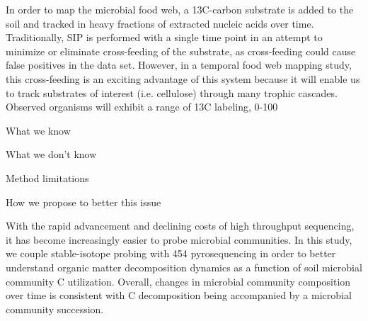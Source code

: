 In order to map the microbial food web, a 13C-carbon substrate is added to the soil and tracked in heavy fractions of extracted nucleic acids over time.  Traditionally, SIP is performed with a single time point in an attempt to minimize or eliminate cross-feeding of the substrate, as cross-feeding could cause false positives in the data set.  However, in a temporal food web mapping study, this cross-feeding is an exciting advantage of this system because it will enable us to track substrates of interest (i.e. cellulose) through many trophic cascades.  Observed organisms will exhibit a range of 13C labeling, 0-100%



What we know 


What we don't know


Method limitations


How we propose to better this issue

With the rapid advancement and declining costs of high throughput sequencing, it has become increasingly easier to probe microbial communities.  In this study, we couple stable-isotope probing with 454 pyrosequencing in order to better understand organic matter decomposition dynamics as a function of soil microbial community C utilization. Overall, changes in microbial community composition over time is consistent with C decomposition being accompanied by a microbial community succession. 
